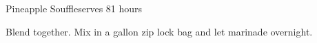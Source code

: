 \begin{recipe}{Pineapple Souffle}{serves 8}{1 hours}

  Blend together.
  Mix in a gallon zip lock bag and let marinade overnight.

\end{recipe}

